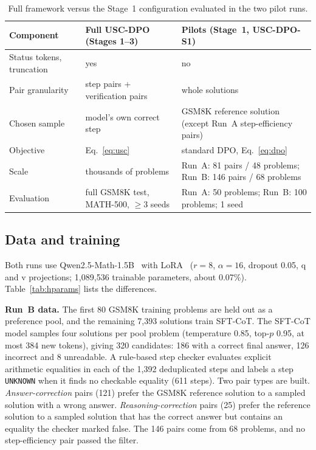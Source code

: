 \documentclass[11pt, a4paper]{article}
\newcommand{\soldpo}{USC-DPO-S1}
\begin{document}
\begin{table}[t]
\centering
\caption{Full framework versus the Stage~1 configuration evaluated in the two pilot runs.}
\label{tab:status}
\small
\begin{tabularx}{\textwidth}{lXX}
\toprule
\textbf{Component} & \textbf{Full USC-DPO (Stages 1--3)} & \textbf{Pilots (Stage~1, \soldpo{})} \\
\midrule
Status tokens, truncation & yes & no \\
Pair granularity & step pairs + verification pairs & whole solutions \\
Chosen sample & model's own correct step & GSM8K reference solution (except Run~A step-efficiency pairs) \\
Objective & Eq.~\eqref{eq:usc} & standard DPO, Eq.~\eqref{eq:dpo} \\
Scale & thousands of problems & Run~A: 81 pairs / 48 problems; Run~B: 146 pairs / 68 problems \\
Evaluation & full GSM8K test, MATH-500, $\ge 3$ seeds & Run~A: 50 problems; Run~B: 100 problems; 1 seed \\
\bottomrule
\end{tabularx}
\end{table}

\subsection{Data and training}
Both runs use Qwen2.5-Math-1.5B~\cite{yang2024qwen25math} with LoRA~\cite{hu2022lora} ($r=8$, $\alpha=16$, dropout 0.05, q and v projections; 1{,}089{,}536 trainable parameters, about 0.07\%). Table~\ref{tab:hparams} lists the differences.

\textbf{Run~B data.} The first 80 GSM8K training problems are held out as a preference pool, and the remaining 7{,}393 solutions train SFT-CoT. The SFT-CoT model samples four solutions per pool problem (temperature 0.85, top-$p$ 0.95, at most 384 new tokens), giving 320 candidates: 186 with a correct final answer, 126 incorrect and 8 unreadable. A rule-based step checker evaluates explicit arithmetic equalities in each of the 1{,}392 deduplicated steps and labels a step \texttt{UNKNOWN} when it finds no checkable equality (611 steps). Two pair types are built. \emph{Answer-correction} pairs (121) prefer the GSM8K reference solution to a sampled solution with a wrong answer. \emph{Reasoning-correction} pairs (25) prefer the reference solution to a sampled solution that has the correct answer but contains an equality the checker marked false. The 146 pairs come from 68 problems, and no step-efficiency pair passed the filter.
\end{document}
